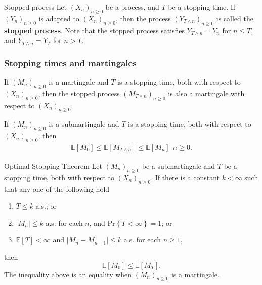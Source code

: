 \begin{defn}{Stopped process}{}
Let \( (X_{n} )_{n\geq 0} \) be a process, and \(T\) be a stopping time. If \( (Y_{n} )_{n\geq 0} \) is adapted to \( (X_{n} )_{n\geq 0} \), then the process \( (Y_{T \wedge  n} )_{n\geq 0} \) is called the \textbf{stopped process}. Note that the stopped process satisfies \(Y_{T \wedge n} = Y_{n} \) for \(n\leq T\), and \(Y_{T \wedge n} = Y_{T} \)  for \(n>T\). 
\end{defn}

\subsubsection{Stopping times and martingales}

\begin{idea}{}{}
If \((M_{n} )_{n\geq 0}\) is a martingale and \(T\) is a stopping time, both with respect to \((X_{n} )_{n\geq 0}\), then the stopped process \((M_{T \wedge n} )_{n\geq 0}\) is also a martingale with respect to \((X_{n} )_{n\geq 0}\).
\end{idea}

\begin{idea}{}{}
If \((M_{n} )_{n\geq 0}\) is a submartingale and \(T\) is a stopping time, both with respect to \((X_{n} )_{n\geq 0}\), then 
\begin{align*}
    \mathbb{E} [M_0] \leq \mathbb{E} [M_{T \wedge n}] \leq \mathbb{E} [M_{n} ]\ \ n \geq 0. 
\end{align*}

\end{idea}

\begin{idea}{Optimal Stopping Theorem}{}
Let \((M_{n} )_{n\geq 0}\) be a submartingale and \(T\) be a stopping time, both with respect to \((X_{n} )_{n\geq 0}\). If there is a constant \(k < \infty \) such that any one of the following hold
\begin{enumerate}[label = \emph{\roman*.)}]
    \item \(T \leq k\) a.s.; or
    \item \(\left\lvert M_{n}   \right\rvert \leq k \) a.s. for each \(n\), and \(\mathrm{Pr} \left\{ T < \infty  \right\}= 1  \); or
    \item \(\mathbb{E} [T] < \infty \) and \(\left\lvert M_{n} - M_{n - 1}  \right\rvert  \leq k\) a.s. for each \( n \geq 1\), 
\end{enumerate}
then
\[
    \mathbb{E} [M_0] \leq \mathbb{E} [M_{T} ]. 
\]
The inequality above is an equality when \((M_{n})_{n\geq 0}\) is a martingale. 
\end{idea}

